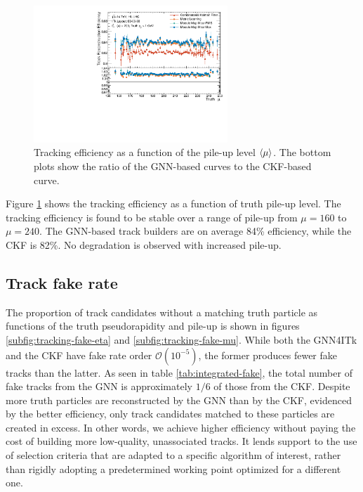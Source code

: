 \begin{figure}[h]
    \centering
    \includegraphics[width=0.65\textwidth]{figures/ckf-gnn/Efficiency/efficiency_vs_truthMu.pdf}
    \caption{Tracking efficiency as a function of the pile-up level $\expval{\mu}$. The bottom plots show the ratio of the GNN-based curves to the CKF-based curve.}
    \label{fig:tracking-eff-mu}
\end{figure}
Figure \ref{fig:tracking-eff-mu} shows the tracking efficiency as a function of truth pile-up level.
The tracking efficiency is found to be stable over a range of pile-up from $\mu=160$ to $\mu=240$. 
The GNN-based track builders are on average 84\% efficiency, while the CKF is 82\%. 
No degradation is observed with increased pile-up.

\subsection{Track fake rate}
\label{subsect:tracking-fake}

The proportion of track candidates without a matching truth particle as functions of the truth pseudorapidity and pile-up is shown in figures  \ref{subfig:tracking-fake-eta} and \ref{subfig:tracking-fake-mu}. 
While both the GNN4ITk and the CKF have fake rate order $\mathcal{O}(10^{-5})$, the former produces fewer fake tracks than the latter.
As seen in table \ref{tab:integrated-fake}, the total number of fake tracks from the GNN is approximately $1/6$ of those from the CKF.
Despite more truth particles are reconstructed by the GNN than by the CKF, evidenced by the better efficiency, only track candidates matched to these particles are created in excess. 
In other words, we achieve higher efficiency without paying the cost of building more low-quality, unassociated tracks. 
It lends support to the use of selection criteria that are adapted to a specific algorithm of interest, rather than rigidly adopting a predetermined working point optimized for a different one. 

